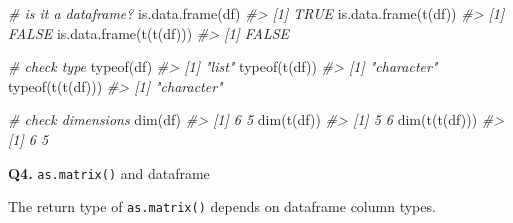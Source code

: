 \documentclass[
]{book}
\newenvironment{Shaded}{\begin{snugshade}}{\end{snugshade}}
\newcommand{\CommentTok}[1]{\textcolor[rgb]{0.56,0.35,0.01}{\textit{#1}}}
\newcommand{\FunctionTok}[1]{\textcolor[rgb]{0.00,0.00,0.00}{#1}}
\newcommand{\NormalTok}[1]{#1}
\begin{document}
\begin{Shaded}
\begin{Highlighting}[]
\CommentTok{\# is it a dataframe?}
\FunctionTok{is.data.frame}\NormalTok{(df)}
\CommentTok{\#\textgreater{} [1] TRUE}
\FunctionTok{is.data.frame}\NormalTok{(}\FunctionTok{t}\NormalTok{(df))}
\CommentTok{\#\textgreater{} [1] FALSE}
\FunctionTok{is.data.frame}\NormalTok{(}\FunctionTok{t}\NormalTok{(}\FunctionTok{t}\NormalTok{(df)))}
\CommentTok{\#\textgreater{} [1] FALSE}

\CommentTok{\# check type}
\FunctionTok{typeof}\NormalTok{(df)}
\CommentTok{\#\textgreater{} [1] "list"}
\FunctionTok{typeof}\NormalTok{(}\FunctionTok{t}\NormalTok{(df))}
\CommentTok{\#\textgreater{} [1] "character"}
\FunctionTok{typeof}\NormalTok{(}\FunctionTok{t}\NormalTok{(}\FunctionTok{t}\NormalTok{(df)))}
\CommentTok{\#\textgreater{} [1] "character"}

\CommentTok{\# check dimensions}
\FunctionTok{dim}\NormalTok{(df)}
\CommentTok{\#\textgreater{} [1] 6 5}
\FunctionTok{dim}\NormalTok{(}\FunctionTok{t}\NormalTok{(df))}
\CommentTok{\#\textgreater{} [1] 5 6}
\FunctionTok{dim}\NormalTok{(}\FunctionTok{t}\NormalTok{(}\FunctionTok{t}\NormalTok{(df)))}
\CommentTok{\#\textgreater{} [1] 6 5}
\end{Highlighting}
\end{Shaded}

\textbf{Q4.} \texttt{as.matrix()} and dataframe

The return type of \texttt{as.matrix()} depends on dataframe column types.
\end{document}
